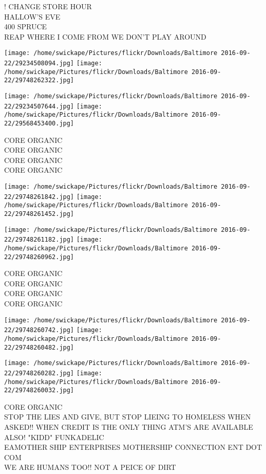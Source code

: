 \documentclass[10pt,letterpaper]{article}
\begin{document}
! CHANGE STORE HOUR\\
HALLOW'S EVE\\
400 SPRUCE\\
REAP WHERE I COME FROM WE DON'T PLAY AROUND
\pagebreak

\texttt{[image: /home/swickape/Pictures/flickr/Downloads/Baltimore 2016-09-22/29234508094.jpg]}
\texttt{[image: /home/swickape/Pictures/flickr/Downloads/Baltimore 2016-09-22/29748262322.jpg]}

\texttt{[image: /home/swickape/Pictures/flickr/Downloads/Baltimore 2016-09-22/29234507644.jpg]}
\texttt{[image: /home/swickape/Pictures/flickr/Downloads/Baltimore 2016-09-22/29568453400.jpg]}

CORE ORGANIC\\
CORE ORGANIC\\
CORE ORGANIC\\
CORE ORGANIC
\pagebreak

\texttt{[image: /home/swickape/Pictures/flickr/Downloads/Baltimore 2016-09-22/29748261842.jpg]}
\texttt{[image: /home/swickape/Pictures/flickr/Downloads/Baltimore 2016-09-22/29748261452.jpg]}

\texttt{[image: /home/swickape/Pictures/flickr/Downloads/Baltimore 2016-09-22/29748261182.jpg]}
\texttt{[image: /home/swickape/Pictures/flickr/Downloads/Baltimore 2016-09-22/29748260962.jpg]}

CORE ORGANIC\\
CORE ORGANIC\\
CORE ORGANIC\\
CORE ORGANIC
\pagebreak

\texttt{[image: /home/swickape/Pictures/flickr/Downloads/Baltimore 2016-09-22/29748260742.jpg]}
\texttt{[image: /home/swickape/Pictures/flickr/Downloads/Baltimore 2016-09-22/29748260482.jpg]}

\texttt{[image: /home/swickape/Pictures/flickr/Downloads/Baltimore 2016-09-22/29748260282.jpg]}
\texttt{[image: /home/swickape/Pictures/flickr/Downloads/Baltimore 2016-09-22/29748260032.jpg]}

CORE ORGANIC\\
STOP THE LIES AND GIVE, BUT STOP LIEING TO HOMELESS WHEN ASKED!! WHEN CREDIT IS THE ONLY THING ATM'S ARE AVAILABLE ALSO! "KIDD" FUNKADELIC\\
EAMOTHER SHIP ENTERPRISES MOTHERSHIP CONNECTION ENT DOT COM\\
WE ARE HUMANS TOO!! NOT A PEICE OF DIRT
\pagebreak
\end{document}
